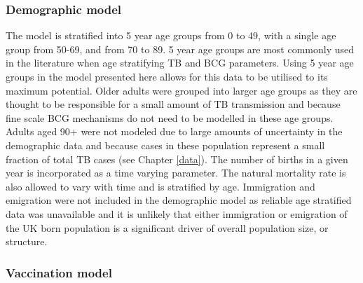 \documentclass[11pt,twoside]{bristolthesis}
\begin{document}
  \hypertarget{demographic-model}{%
  \subsubsection{Demographic model}\label{demographic-model}}
  
  The model is stratified into 5 year age groups from 0 to 49, with a single age group from 50-69, and from 70 to 89. 5 year age groups are most commonly used in the literature when age stratifying TB and BCG parameters. Using 5 year age groups in the model presented here allows for this data to be utilised to its maximum potential. Older adults were grouped into larger age groups as they are thought to be responsible for a small amount of TB transmission and because fine scale BCG mechanisms do not need to be modelled in these age groups. Adults aged 90+ were not modeled due to large amounts of uncertainty in the demographic data and because cases in these population represent a small fraction of total TB cases (see Chapter \ref{data}). The number of births in a given year is incorporated as a time varying parameter. The natural mortality rate is also allowed to vary with time and is stratified by age. Immigration and emigration were not included in the demographic model as reliable age stratified data was unavailable and it is unlikely that either immigration or emigration of the UK born population is a significant driver of overall population size, or structure.
  
  \hypertarget{vaccination-model}{%
  \subsubsection{Vaccination model}\label{vaccination-model}}
  
\end{document}
